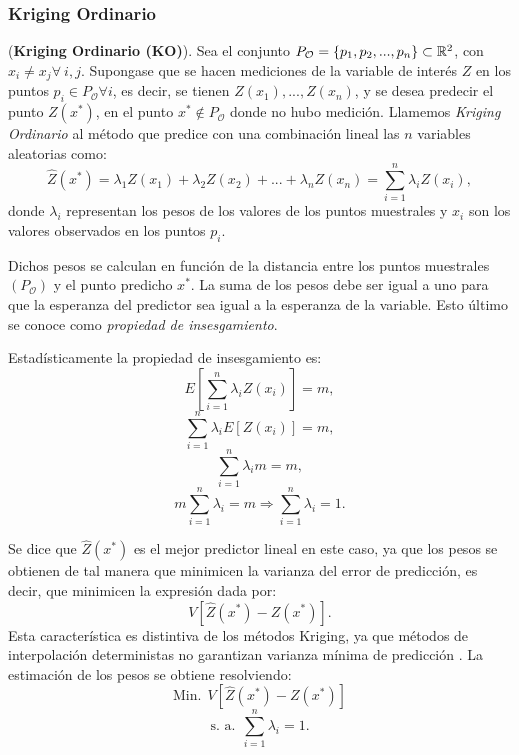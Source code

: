 \subsubsection{Kriging Ordinario}

\begin{defn} (\textbf{Kriging Ordinario (KO)}). Sea el conjunto $P_{\mathcal{O}} = \{ p_{1}, p_{2}, ..., p_{n} \} \\ \subset \mathbb{R}^{2}$, con $x_{i} \neq x_{j} \forall \ i, j$. Supongase que se hacen mediciones de la variable de interés $Z$ en los puntos $p_{i} \in P_{\mathcal{O}} \forall i$, es decir, se tienen $Z(x_{1}), ..., Z(x_{n})$, y se desea predecir el punto $Z(x^{*})$, en el punto $x^{*}\notin P_{\mathcal{O}}$ donde no hubo medición. Llamemos \textit{Kriging Ordinario} al método que predice con una combinación lineal las $n$ variables aleatorias como:
\begin{equation}
\hat{Z}(x^{*}) = \lambda_{1} Z(x_{1}) + \lambda_{2} Z(x_{2}) + ... + \lambda_{n} Z(x_{n}) = \sum_{i=1}^{n} \lambda_{i} Z(x_{i}), \end{equation} donde $\lambda_{i}$ representan los pesos de los valores de los puntos muestrales y $x_{i}$ son los valores observados en los puntos $p_{i}$.
\end{defn}

Dichos pesos se calculan en función de la distancia entre los puntos muestrales $(P_{\mathcal{O}})$ y el punto predicho $x^{*}$. La suma de los pesos debe ser igual a uno para que la esperanza del predictor sea igual a la esperanza de la variable. Esto último se conoce como \textit{propiedad de insesgamiento}. 

Estadísticamente la propiedad de insesgamiento es:
\[ E\left[ \sum_{i=1}^{n} \lambda_{i} Z(x_{i}) \right] = m, \]
\[ \sum_{i=1}^{n}  \lambda_{i} E[Z(x_{i})] = m, \]
\[ \sum_{i=1}^{n}  \lambda_{i} m = m, \]
\[m \sum_{i=1}^{n}  \lambda_{i} = m \Rightarrow \sum_{i=1}^{n}  \lambda_{i} = 1.\]

Se dice que $\hat{Z}(x^{*})$ es el mejor predictor lineal en este caso, ya que los pesos se obtienen de tal manera que minimicen la varianza del error de predicción, es decir, que minimicen la expresión dada por:
\begin{equation}
V[ \hat{Z}(x^{*}) - Z(x^{*})].
\end{equation}
Esta característica es distintiva de los métodos Kriging, ya que métodos de interpolación deterministas no garantizan
varianza mínima de predicción \citep{samper}. La estimación de los pesos se obtiene resolviendo:
\[\text{Min.} \ \ V[ \hat{Z}(x^{*}) - Z(x^{*})] \]
\[ \text{s. a.} \ \ \sum_{i=1}^{n}  \lambda_{i} = 1. \] 


